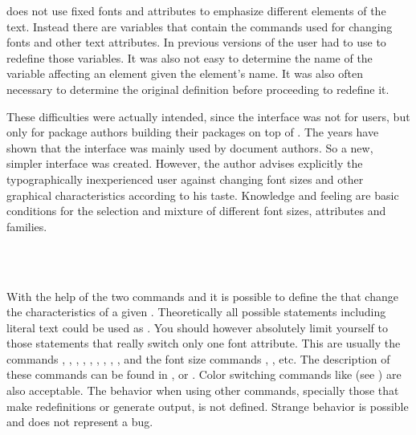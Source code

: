 %
\begin{Explain}
  \KOMAScript{} does not use fixed fonts and attributes to emphasize
  different elements of the text. Instead there are variables
  that contain the commands used for changing fonts and other text
  attributes. In previous versions of \KOMAScript{} the user had to
  use  to redefine those variables. It was also
  not easy to determine the name of the variable affecting an element
  given the element's name. It was also often necessary to determine
  the original definition before proceeding to redefine it.

  These difficulties were actually intended, since the interface was not
  for users, but only for package authors building their
  packages on top of \KOMAScript{}. The years have shown that the
  interface was mainly used by document authors. So a new, simpler
  interface was created. However, the author advises explicitly the
  typographically inexperienced user against changing font sizes and
  other graphical characteristics according to his taste. Knowledge
  and feeling are basic conditions for the selection and mixture of
  different font sizes, attributes and families.
\end{Explain}

\begin{Declaration}
  \\
  \\
\end{Declaration}%
%
%
%
With the help of the two commands 
and  it is possible to define the
 that change the characteristics of a given
. Theoretically all possible statements including
literal text could be used as .  You should however
absolutely limit yourself to those statements that really switch only
one font attribute. This are usually the commands ,
, , ,
, , , ,
,  and the font size commands
, ,  etc. The description of
these commands can be found in \cite{lshort}, \cite{latex:usrguide} or
\cite{latex:fntguide}. Color switching commands like
 (see \cite{package:graphics}) are also acceptable.
The behavior when using other commands, specially those that make
redefinitions or generate output, is not defined. Strange behavior is
possible and does not represent a bug.


